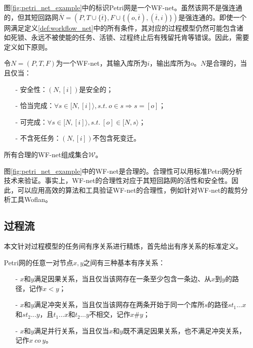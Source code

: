 图\ref{fig:petri_net_example}中的标识Petri网是一个WF-net。虽然该网不是强连通的，但其短回路网$\overline{N}=(P,T\cup\{\overline{t}\},F\cup\{(o,\overline{t}),(\overline{t},i)\})$是强连通的。即使一个网满足定义\ref{def:workflow_net}中的所有条件，其对应的过程模型仍然可能包含诸如死锁、永远不被使能的任务、活锁、过程终止后有残留托肯等错误。因此，需要定义如下原则。

\begin{definition}[合理性]\label{def:sound}
令$N=(P,T,F)$为一个WF-net，其输入库所为$i$，输出库所为$o$。$N$是合理的，当且仅当：
  \begin{itemize}
  	\item[-] 安全性：$(N,[i])$是安全的；
  	\item[-] 恰当完成：$\forall s\in[N,[i]\rangle,s.t.~o\in s\Rightarrow s=[o]$；
  	\item[-] 可完成：$\forall s\in[N,[i]\rangle,s.t.~[o]\in[N,s\rangle$；
  	\item[-] 不含死任务：$(N,[i])$不包含死变迁。
  \end{itemize}
所有合理的WF-net组成集合$\mathcal{W}$。
\end{definition}

图\ref{fig:petri_net_example}中的WF-net是合理的。合理性可以用标准Petri网分析技术来验证。事实上，WF-net的合理性对应于其短回路网的活性和安全性\cite{van1997verification,van1998application,van2004workflowbook}。因此，可以应用高效的算法和工具验证WF-net的合理性，例如针对WF-net的裁剪分析工具Woflan\cite{verbeek2001diagnosing}。

\subsection{过程流}\label{subsec:process_run}
本文针对过程模型的任务间有序关系进行精炼，首先给出有序关系的标准定义。

\begin{definition}\label{def:ordering_relations}
Petri网的任意一对节点$x,y$之间有三种基本有序关系：
  \begin{itemize}
  	\item[-] $x$和$y$满足因果关系，当且仅当该网存在一条至少包含一条边、从$x$到$y$的路径，记作$x<y$；
  	\item[-] $x$和$y$满足冲突关系，当且仅当该网存在两条开始于同一个库所$s$的路径$st_{1}...x$和$st_{2}...y$，且$t_{1}...x$和$t_{2}...y$不相交，记作$x\#y$；
  	\item[-] $x$和$y$满足并行关系，当且仅当$x$和$y$既不满足因果关系，也不满足冲突关系，记作$x~co~y$。
  \end{itemize}
\end{definition}

